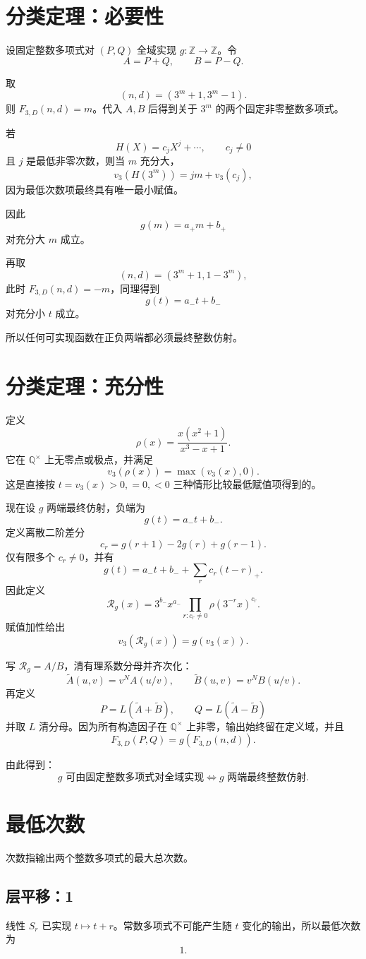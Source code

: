 \documentclass[11pt,a4paper]{ctexart}
\newcommand{\F}{F_{3,D}}
\begin{document}
\section{分类定理：必要性}
设固定整数多项式对 \((P,Q)\) 全域实现 \(g:\mathbb Z\to\mathbb Z\)。令
\[
A=P+Q,\qquad B=P-Q.
\]

取
\[
(n,d)=(3^m+1,3^m-1).
\]
则 \(\F(n,d)=m\)。代入 \(A,B\) 后得到关于 \(3^m\) 的两个固定非零整数多项式。

若
\[
H(X)=c_jX^j+\cdots,\qquad c_j\ne0
\]
且 \(j\) 是最低非零次数，则当 \(m\) 充分大，
\[
v_3(H(3^m))=jm+v_3(c_j),
\]
因为最低次数项最终具有唯一最小赋值。

因此
\[
g(m)=a_+m+b_+
\]
对充分大 \(m\) 成立。

再取
\[
(n,d)=(3^m+1,1-3^m),
\]
此时 \(\F(n,d)=-m\)，同理得到
\[
g(t)=a_-t+b_-
\]
对充分小 \(t\) 成立。

所以任何可实现函数在正负两端都必须最终整数仿射。

\section{分类定理：充分性}
定义
\[
\rho(x)=\frac{x(x^2+1)}{x^3-x+1}.
\]
它在 \(\mathbb Q^\times\) 上无零点或极点，并满足
\[
\boxed{
v_3(\rho(x))=\max(v_3(x),0).
}
\]
这是直接按 \(t=v_3(x)>0,=0,<0\) 三种情形比较最低赋值项得到的。

现在设 \(g\) 两端最终仿射，负端为
\[
g(t)=a_-t+b_-.
\]
定义离散二阶差分
\[
c_r=g(r+1)-2g(r)+g(r-1).
\]
仅有限多个 \(c_r\ne0\)，并有
\[
g(t)=a_-t+b_-+\sum_r c_r(t-r)_+.
\]
因此定义
\[
\boxed{
\mathcal R_g(x)=
3^{b_-}x^{a_-}
\prod_{r:c_r\ne0}\rho(3^{-r}x)^{c_r}.
}
\]
赋值加性给出
\[
v_3(\mathcal R_g(x))=g(v_3(x)).
\]

写 \(\mathcal R_g=A/B\)，清有理系数分母并齐次化：
\[
\widetilde A(u,v)=v^N A(u/v),\qquad
\widetilde B(u,v)=v^N B(u/v).
\]
再定义
\[
P=L(\widetilde A+\widetilde B),\qquad
Q=L(\widetilde A-\widetilde B)
\]
并取 \(L\) 清分母。因为所有构造因子在 \(\mathbb Q^\times\) 上非零，输出始终留在定义域，并且
\[
\F(P,Q)=g(\F(n,d)).
\]

由此得到：
\[
\boxed{
g\text{ 可由固定整数多项式对全域实现}
\iff
g\text{ 两端最终整数仿射}.
}
\]

\section{最低次数}
次数指输出两个整数多项式的最大总次数。

\subsection{层平移：1}
线性 \(S_r\) 已实现 \(t\mapsto t+r\)。常数多项式不可能产生随 \(t\) 变化的输出，所以最低次数为
\[
\boxed1.
\]
\end{document}
